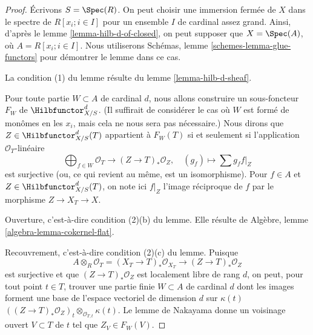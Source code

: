 \begin{proof}
Écrivons $S = \Spec(R)$. On peut choisir une immersion fermée de $X$
dans le spectre de $R[x_i; i \in I]$ pour un ensemble $I$ de cardinal
assez grand. Ainsi, d'après le lemme \ref{lemma-hilb-d-of-closed},
on peut supposer que $X = \Spec(A)$, où $A = R[x_i; i \in I]$.
Nous utiliserons Schémas, lemme \ref{schemes-lemma-glue-functors} pour démontrer le
lemme dans ce cas.

\medskip\noindent
La condition (1) du lemme résulte du lemme \ref{lemma-hilb-d-sheaf}.

\medskip\noindent
Pour toute partie $W \subset A$ de cardinal $d$, nous allons
construire un sous-foncteur $F_W$ de $\Hilbfunctor^d_{X/S}$.
(Il suffirait de considérer le cas où $W$ est formé de
monômes en les $x_i$, mais cela ne nous sera pas nécessaire.)
Nous dirons que $Z \in \Hilbfunctor^d_{X/S}(T)$ appartient à $F_W(T)$
si et seulement si l'application $\mathcal{O}_T$-linéaire
$$
\bigoplus\nolimits_{f \in W} \mathcal{O}_T
\longrightarrow
(Z \to T)_*\mathcal{O}_Z,\quad
(g_f) \longmapsto \sum g_f f|_Z
$$
est surjective (ou, ce qui revient au même, est un isomorphisme). Pour $f \in A$
et $Z \in \Hilbfunctor^d_{X/S}(T)$, on note ici $f|_Z$ l'image réciproque de $f$
par le morphisme $Z \to X_T \to X$.

\medskip\noindent
Ouverture, c'est-à-dire condition (2)(b) du lemme. Elle résulte de
Algèbre, lemme \ref{algebra-lemma-cokernel-flat}.

\medskip\noindent
Recouvrement, c'est-à-dire condition (2)(c) du lemme. Puisque
$$
A \otimes_R \mathcal{O}_T =
(X_T \to T)_*\mathcal{O}_{X_T} \to (Z \to T)_*\mathcal{O}_Z
$$
est surjective et que $(Z \to T)_*\mathcal{O}_Z$ est localement libre
de rang $d$, on peut, pour tout point $t \in T$, trouver une partie finie
$W \subset A$ de cardinal $d$ dont les images forment une base
de l'espace vectoriel de dimension $d$ sur $\kappa(t)$
$((Z \to T)_*\mathcal{O}_Z)_t \otimes_{\mathcal{O}_{T, t}} \kappa(t)$.
Le lemme de Nakayama donne un voisinage ouvert $V \subset T$
de $t$ tel que $Z_V \in F_W(V)$.


\end{proof}
